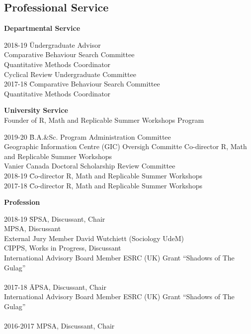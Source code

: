 \documentclass[margin,line]{res}
\begin{document}
{\begin{resume}
\section{\sc  Professional Service}
\textbf{Departmental Service}\\
\vspace{-3em}
\begin{tabbing}
2018-19    \=  Undergraduate Advisor\\
\> Comparative Behaviour Search Committee\\
\> Quantitative Methods Coordinator \\
\> Cyclical Review Undergraduate Committee \\
2017-18    \=  Comparative Behaviour Search Committee\\
\> Quantitative Methods Coordinator
\end{tabbing}

\textbf{University Service}\\
Founder of R, Math and Replicable Summer Workshops Program

\begin{tabbing}
2019-20 \= B.A.\&Sc. Program Administration Committee \\
\> Geographic Information Centre (GIC) Oversigh Committe
\> Co-director  R, Math and Replicable Summer Workshops \\
\> Vanier Canada Doctoral Scholarship Review Committee \\
2018-19 \=  Co-director  R, Math and Replicable Summer Workshops\\
2017-18 \=  Co-director  R, Math and Replicable Summer Workshops
\end{tabbing}


\textbf{Profession}\\
\vspace{-3em}

\begin{tabbing}
2018-19 \=  SPSA, Discussant, Chair\\
\> MPSA, Discussant \\
\> External Jury Member David Wutchiett (Sociology UdeM) \\
\> CIPPS, Works in Progress, Discussant\\
\> International Advisory Board Member ESRC (UK) Grant ``Shadows of
The Gulag''\\
\\
2017-18 \=  APSA, Discussant, Chair\\
\> International Advisory Board Member ESRC (UK) Grant ``Shadows of
The Gulag''\\
\\
2016-2017 MPSA, Discussant, Chair \\
\end{tabbing}
\vspace{-2em}


\end{resume}}
\end{document}
